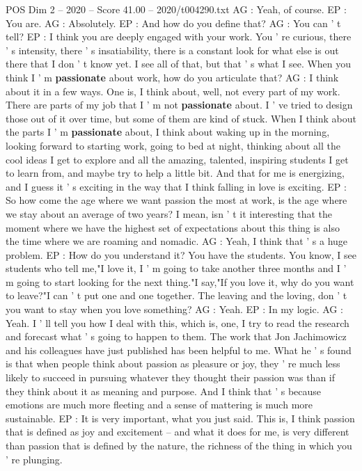 \begin{textsample}{POS Dim 2 – 2020 – Score 41.00 – 2020/t004290.txt}
AG : Yeah, of course.
EP : You are.
AG : Absolutely.
EP : And how do you define that?
AG : You can ' t tell?
EP : I think you are deeply engaged with your work.
You ' re curious, there ' s intensity, there ' s insatiability, there is a constant look for what else is out there that I don ' t know yet.
I see all of that, but that ' s what I see.
When you think I ' m \textbf{passionate} about work, how do you articulate that?
AG : I think about it in a few ways.
One is, I think about, well, not every part of my work.
There are parts of my job that I ' m not \textbf{passionate} about.
I ' ve tried to design those out of it over time, but some of them are kind of stuck.
When I think about the parts I ' m \textbf{passionate} about, I think about waking up in the morning, looking forward to starting work, going to bed at night, thinking about all the cool ideas I get to explore and all the amazing, talented, inspiring students I get to learn from, and maybe try to help a little bit.
And that for me is energizing, and I guess it ' s exciting in the way that I think falling in love is exciting.
EP : So how come the age where we want passion the most at work, is the age where we stay about an average of two years?
I mean, isn ' t it interesting that the moment where we have the highest set of expectations about this thing is also the time where we are roaming and nomadic.
AG : Yeah, I think that ' s a huge problem.
EP : How do you understand it?
You have the students.
You know, I see students who tell me,"I love it, I ' m going to take another three months and I ' m going to start looking for the next thing."I say,"If you love it, why do you want to leave?"I can ' t put one and one together.
The leaving and the loving, don ' t you want to stay when you love something?
AG : Yeah.
EP : In my logic.
AG : Yeah.
I ' ll tell you how I deal with this, which is, one, I try to read the research and forecast what ' s going to happen to them.
The work that Jon Jachimowicz and his colleagues have just published has been helpful to me.
What he ' s found is that when people think about passion as pleasure or joy, they ' re much less likely to succeed in pursuing whatever they thought their passion was than if they think about it as meaning and purpose.
And I think that ' s because emotions are much more fleeting and a sense of mattering is much more sustainable.
EP : It is very important, what you just said.
This is, I think passion that is defined as joy and excitement -- and what it does for me, is very different than passion that is defined by the nature, the richness of the thing in which you ' re plunging.

\end{textsample}
